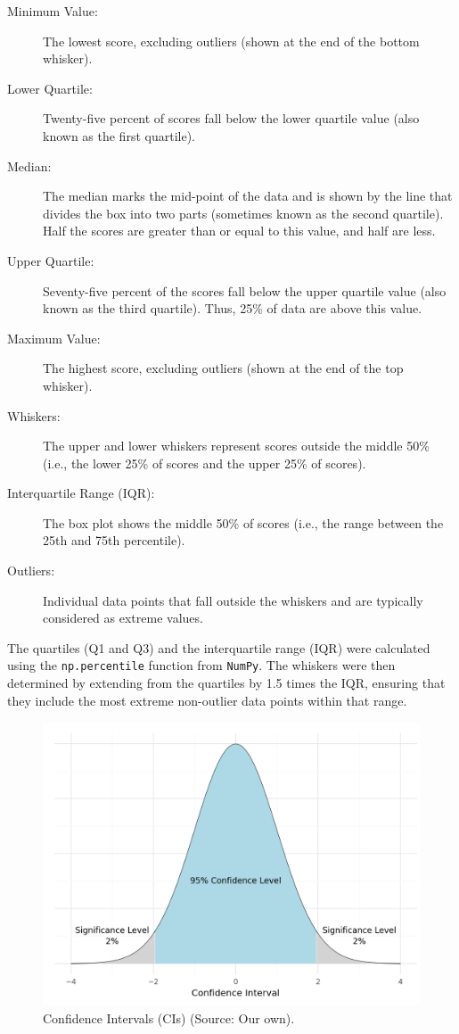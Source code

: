 \begin{description}
    \item[Minimum Value:] The lowest score, excluding outliers (shown at the end of the bottom whisker).
    \item[Lower Quartile:] Twenty-five percent of scores fall below the lower quartile value (also known as the first quartile).
    \item[Median:] The median marks the mid-point of the data and is shown by the line that divides the box into two parts (sometimes known as the second quartile). Half the scores are greater than or equal to this value, and half are less.
    \item[Upper Quartile:] Seventy-five percent of the scores fall below the upper quartile value (also known as the third quartile). Thus, 25\% of data are above this value.
    \item[Maximum Value:] The highest score, excluding outliers (shown at the end of the top whisker).
    \item[Whiskers:] The upper and lower whiskers represent scores outside the middle 50\% (i.e., the lower 25\% of scores and the upper 25\% of scores).
    \item[Interquartile Range (IQR):] The box plot shows the middle 50\% of scores (i.e., the range between the 25th and 75th percentile).
    \item[Outliers:] Individual data points that fall outside the whiskers and are typically considered as extreme values.
\end{description}

The quartiles (Q1 and Q3) and the interquartile range (IQR) were calculated using the \texttt{np.percentile} function from \texttt{NumPy}. The whiskers were then determined by extending from the quartiles by 1.5 times the IQR, ensuring that they include the most extreme non-outlier data points within that range.

\begin{figure}[htb]
\centering
\includegraphics[width=.6\textwidth]{textual/Figuras/confidence-intervals.png}
\caption{Confidence Intervals (CIs) (Source: Our own).}
\label{fig:ci}
\end{figure}


